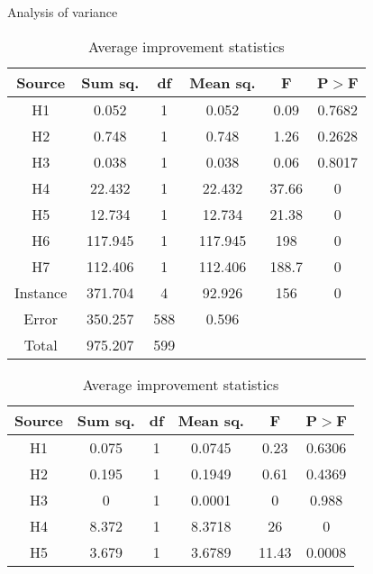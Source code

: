 \documentclass[../main.tex]{subfiles}
\begin{document}
\begin{table}
    \centering
    \caption{Analysis of variance}
    \begin{adjustbox}{width=\columnwidth,center}
        \begin{subtable}{.75\columnwidth}
            \centering
            \begin{tabular}{cccccc}
            \hline
            Source  &Sum sq.    &df &Mean sq.   &F      &P$>$F \\ 
            \hline
            H1      & 0.052     & 1 & 0.052     & 0.09  & 0.7682\\
            H2      & 0.748     & 1 & 0.748     & 1.26  & 0.2628\\
            H3      & 0.038     & 1 & 0.038     & 0.06  & 0.8017\\
            H4      & 22.432    & 1 & 22.432    & 37.66 & 0     \\
            H5      & 12.734    & 1 & 12.734    & 21.38 & 0     \\
            H6      & 117.945   & 1 & 117.945   & 198   & 0     \\
            H7      & 112.406   & 1 & 112.406   & 188.7 & 0     \\
            Instance& 371.704   & 4 & 92.926    & 156   & 0     \\
            Error   & 350.257   &588& 0.596     &       &       \\
            Total   & 975.207   &599&           &       &       \\
            \hline
            \end{tabular}
        \caption{Average improvement statistics}
        \label{tab:anovaAvrgNormal}
        \end{subtable}
        \hfill
        \begin{subtable}{.75\columnwidth}
            \centering
            \begin{tabular}{cccccc}
            \hline
            Source  &Sum sq.    &df &Mean sq.   &F      &P$>$F \\ 
            \hline
            H1      & 0.075     & 1 & 0.0745    & 0.23  & 0.6306\\
            H2      & 0.195     & 1 & 0.1949    & 0.61  & 0.4369\\
            H3      & 0         & 1 & 0.0001    & 0     & 0.988 \\
            H4      & 8.372     & 1 & 8.3718    & 26    & 0     \\
            H5      & 3.679     & 1 & 3.6789    & 11.43 & 0.0008\\

\end{tabular}
\end{subtable}
\end{adjustbox}
\end{table}
\end{document}
